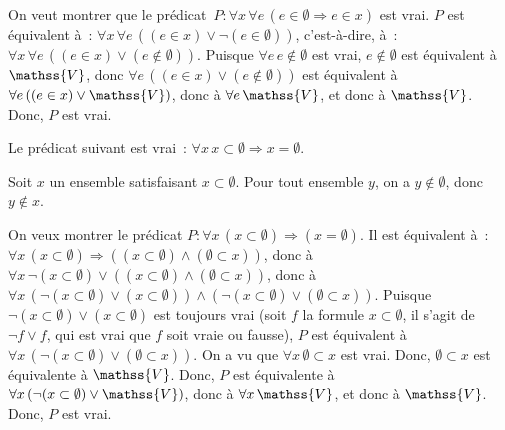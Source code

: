 \done

\blank[medium]

\noindent{} 
    On veut montrer que le prédicat $P: \forall x \, \forall e \, (e \in \emptyset \Rightarrow e \in x)$ est vrai. 
    $P$ est équivalent à : $\forall x \, \forall e \, ((e \in x) \vee \lnot (e \in \emptyset))$, c'est-à-dire, à : $\forall x \, \forall e \, ((e \in x) \vee (e \notin \emptyset))$.
    Puisque $\forall e \, e \notin \emptyset$ est vrai, $e \notin \emptyset$ est équivalent à $\mathss{V}$, donc $\forall e \, ((e \in x) \vee (e \notin \emptyset))$ est équivalent à $\forall e \, ((e \in x) \vee \mathss{V})$, donc à $\forall e \, \mathss{V}$, et donc à $\mathss{V}$.
    Donc, $P$ est vrai. 

    \done

\blank[medium]

\noindent{} Le prédicat suivant est vrai : $\forall x \, x \subset \emptyset \Rightarrow x = \emptyset$.

\blank[medium]

\noindent{} Soit $x$ un ensemble satisfaisant $x \subset \emptyset$.
    Pour tout ensemble $y$, on a $y \notin \emptyset$, donc $y \notin x$.
    
\done

\blank[medium]

\noindent{} 
    On veux montrer le prédicat $P: \forall x \, (x \subset \emptyset) \Rightarrow (x = \emptyset)$.
    Il est équivalent à : $\forall x \, (x \subset \emptyset) \Rightarrow ((x \subset \emptyset) \wedge (\emptyset \subset x))$, donc à $\forall x \, \lnot (x \subset \emptyset) \vee ((x \subset \emptyset) \wedge (\emptyset \subset x))$, donc à $\forall x \, (\lnot (x \subset \emptyset) \vee (x \subset \emptyset)) \wedge (\lnot (x \subset \emptyset) \vee (\emptyset \subset x))$.
    Puisque $\lnot (x \subset \emptyset) \vee (x \subset \emptyset)$ est toujours vrai (soit $f$ la formule $x \subset \emptyset$, il s'agit de $\lnot f \vee f$, qui est vrai que $f$ soit vraie ou fausse), $P$ est équivalent à $\forall x \, (\lnot (x \subset \emptyset) \vee (\emptyset \subset x))$.
    On a vu que $\forall x \, \emptyset \subset x$ est vrai.
    Donc, $\emptyset \subset x$ est équivalente à $\mathss{V}$.
    Donc, $P$ est équivalente à $\forall x \, (\lnot (x \subset \emptyset) \vee \mathss{V})$, donc à $\forall x \, \mathss{V}$, et donc à $\mathss{V}$.
    Donc, $P$ est vrai.

    \done

